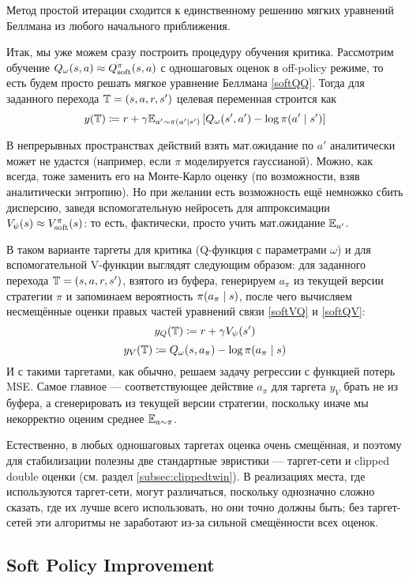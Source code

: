 \begin{proposition}
Метод простой итерации сходится к единственному решению мягких уравнений Беллмана из любого начального приближения.
\end{proposition}

Итак, мы уже можем сразу построить процедуру обучения критика. Рассмотрим обучение $Q_\omega(s, a) \HM \approx Q^\pi_{\soft}(s, a)$ с одношаговых оценок в off-policy режиме, то есть будем просто решать мягкое уравнение Беллмана \eqref{softQQ}. Тогда для заданного перехода $\T \HM= (s, a, r, s')$ целевая переменная строится как
$$y(\mathbb{T}) \coloneqq r + \gamma \mathbb{E}_{a' \sim \pi(a' \mid s')} \left[ Q_\omega(s', a') - \log \pi(a' \mid s') \right]$$

В непрерывных пространствах действий взять мат.ожидание по $a'$ аналитически может не удастся (например, если $\pi$ моделируется гауссианой). Можно, как всегда, тоже заменить его на Монте-Карло оценку (по возможности, взяв аналитически энтропию). Но при желании есть возможность ещё немножко сбить дисперсию, заведя вспомогательную нейросеть для аппроксимации $V_\psi(s) \HM \approx V^\pi_{\soft}(s)$: то есть, фактически, просто учить мат.ожидание $\mathbb{E}_{a'}$.

В таком варианте таргеты для критика (Q-функция с параметрами $\omega$) и для вспомогательной V-функции выглядят следующим образом: для заданного перехода $\T \HM= (s, a, r, s')$, взятого из буфера, генерируем $a_\pi$ из текущей версии стратегии $\pi$ и запоминаем вероятность $\pi(a_\pi \HM\mid s)$, после чего вычисляем несмещённые оценки правых частей уравнений связи \eqref{softVQ} и \eqref{softQV}:
$$y_Q(\mathbb{T}) \coloneqq r + \gamma V_\psi(s')$$
$$y_V(\mathbb{T}) \coloneqq Q_\omega(s, a_\pi) - \log \pi(a_\pi \mid s)$$
И с такими таргетами, как обычно, решаем задачу регрессии с функцией потерь MSE. Самое главное --- соответствующее действие $a_\pi$ для таргета $y_V$ брать не из буфера, а сгенерировать из текущей версии стратегии, поскольку иначе мы некорректно оценим среднее $\mathbb{E}_{a \sim \pi}$.

Естественно, в любых одношаговых таргетах оценка очень смещённая, и поэтому для стабилизации полезны две стандартные эвристики --- таргет-сети и clipped double оценки (см. раздел \ref{subsec:clippedtwin}). В реализациях места, где используются таргет-сети, могут различаться, поскольку однозначно сложно сказать, где их лучше всего использовать, но они точно должны быть; без таргет-сетей эти алгоритмы не заработают из-за сильной смещённости всех оценок.

\subsection{Soft Policy Improvement}

